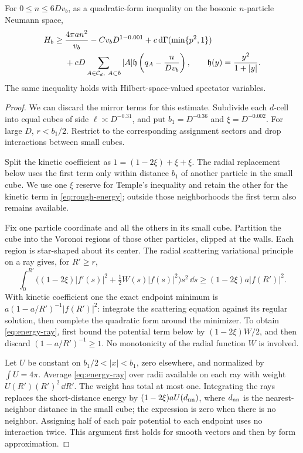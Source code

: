 \begin{lemma}\label{lem:energy-rough}
For $0\le n\le6Dv_b$, as a quadratic-form inequality on the bosonic
$n$-particle Neumann space,
\begin{equation}\label{eq:rough-energy}
\begin{split}
 H_b\ge{}&\frac{4\pi an^2}{v_b}-Cv_bD^{1-0.001}
       +c\,\mathrm d\Gamma(\min\{p^2,1\})\\
 &+cD\sum_{A\in\mathcal C_d,\ A\subset b}|A|
    \mathfrak h\left(q_A-\frac{n}{Dv_b}\right),
 \qquad \mathfrak h(y)=\frac{y^2}{1+|y|}.
\end{split}
\end{equation}
The same inequality holds with Hilbert-space-valued spectator variables.
\end{lemma}

\begin{proof}
We can discard the mirror terms for this estimate.  Subdivide each
$d$-cell into equal cubes of side $\ell\asymp D^{-0.31}$, and put
$b_1=D^{-0.36}$ and $\xi=D^{-0.002}$.  For large $D$, $r<b_1/2$.
Restrict to the corresponding assignment sectors and drop interactions
between small cubes.

Split the kinetic coefficient as $1=(1-2\xi)+\xi+\xi$.
The radial replacement below uses the first term only within distance
$b_1$ of another particle in the small cube.  We use one $\xi$ reserve
for Temple's inequality and retain the other for the kinetic term in
\eqref{eq:rough-energy}; outside those neighborhoods the first term
also remains available.

Fix one particle coordinate and all the others in its small cube.
Partition the cube into the Voronoi regions of those other particles,
clipped at the walls.  Each region is star-shaped about its center.
The radial scattering variational principle on a ray gives, for
$R'\ge r$,
\begin{equation}\label{eq:energy-ray}
 \int_0^{R'}\bigl((1-2\xi)|f'(s)|^2+\tfrac12W(s)|f(s)|^2\bigr)
                  s^2\,\dd s
 \ge(1-2\xi)a|f(R')|^2.
\end{equation}
With kinetic coefficient one the exact endpoint minimum is
$a(1-a/R')^{-1}|f(R')|^2$: integrate the scattering equation against its
regular solution, then complete the quadratic form around the minimizer.
To obtain \eqref{eq:energy-ray}, first bound the potential term below by
$(1-2\xi)W/2$, and then discard $(1-a/R')^{-1}\ge1$.
No monotonicity of the radial function $W$ is involved.

Let $U$ be constant on $b_1/2<|x|<b_1$, zero elsewhere, and normalized
by $\int U=4\pi$.  Average \eqref{eq:energy-ray} over radii available
on each ray with weight $U(R')(R')^2\,\dd R'$.  The weight has total at
most one.  Integrating the rays replaces the short-distance energy by
$(1-2\xi)aU(d_{\rm nn})$, where $d_{\rm nn}$ is the nearest-neighbor
distance in the small cube; the expression is zero when there is no
neighbor.  Assigning half of each pair potential to each endpoint uses
no interaction twice.  This argument first holds for smooth vectors
and then by form approximation.


\end{proof}
